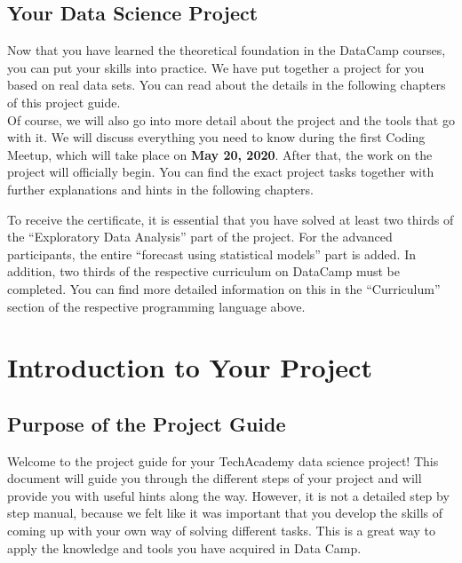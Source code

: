 \documentclass[
  11pt,
]{article}
\begin{document}
\hypertarget{your-data-science-project}{%
\subsection{Your Data Science Project}\label{your-data-science-project}}

Now that you have learned the theoretical foundation in the DataCamp courses, you can put your skills into practice. We have put together a project for you based on real data sets. You can read about the details in the following chapters of this project guide.\\
Of course, we will also go into more detail about the project and the tools that go with it. We will discuss everything you need to know during the first Coding Meetup, which will take place on \textbf{May 20, 2020}. After that, the work on the project will officially begin.
You can find the exact project tasks together with further explanations and hints in the following chapters.

To receive the certificate, it is essential that you have solved at least two thirds of the ``Exploratory Data Analysis'' part of the project. For the advanced participants, the entire ``forecast using statistical models'' part is added. In addition, two thirds of the respective curriculum on DataCamp must be completed. You can find more detailed information on this in the ``Curriculum'' section of the respective programming language above.

\newpage

\hypertarget{introduction-to-your-project}{%
\section{Introduction to Your Project}\label{introduction-to-your-project}}

\hypertarget{purpose-of-the-project-guide}{%
\subsection{Purpose of the Project Guide}\label{purpose-of-the-project-guide}}

Welcome to the project guide for your TechAcademy data science project! This document will guide you through the different steps of your project and will provide you with useful hints along the way. However, it is not a detailed step by step manual, because we felt like it was important that you develop the skills of coming up with your own way of solving different tasks. This is a great way to apply the knowledge and tools you have acquired in Data Camp.
\end{document}
